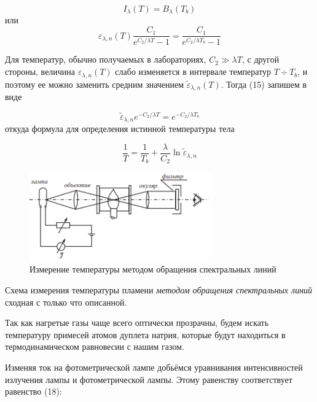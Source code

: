 \documentclass[12pt,a4paper]{article}
\begin{document}
\begin{equation}
I_{\lambda}(T) = B_{\lambda}(T_b)
\end{equation}
или 
\begin{equation}
\varepsilon_{\lambda ,n}(T)\frac{C_1}{e^{C_2/{\lambda}T}-1}=\frac{C_1}{e^{C_2/{\lambda}T_b}-1}
\end{equation}

\par Для температур, обычно получаемых в лабораториях, $C_2 \gg \lambda{T}$, с другой стороны, величина $\varepsilon_{\lambda ,n}(T)$ слабо изменяется в интервале температур $T \div T_b$, и поэтому ее можно заменить средним значением $\tilde{\varepsilon}_{\lambda ,n}(T)$. Тогда (15) запишем в виде

\begin{equation}
\tilde{\varepsilon}_{\lambda ,n}e^{-C_2/{\lambda}T}=e^{-C_2/{\lambda}T_b}
\end{equation}
откуда формула для определения истинной температуры тела

\begin{equation}
\frac{1}{T} = \frac{1}{T_b}+\frac{\lambda}{C_2}\ln \tilde{\varepsilon}_{\lambda ,n}
\end{equation}

\begin{figure}[h!]
	\begin{center}
		\includegraphics[width = 0.7\textwidth]{MSS-1-4}
		\caption{Измерение температуры методом обращения спектральных линий}
	\end{center}
\end{figure}

\par Схема измерения температуры пламени \textit{методом обращения спектральных линий} сходная с только что описанной.
\par Так как нагретые газы чаще всего оптически прозрачны, будем искать температуру примесей атомов дуплета натрия, которые будут находиться в термодинамическом равновесии с нашим газом.
\par Изменяя ток на фотометрической лампе добьёмся уравнивания интенсивностей излучения лампы и фотометрической лампы. Этому равенству соответствует равенство (18):
\end{document}
